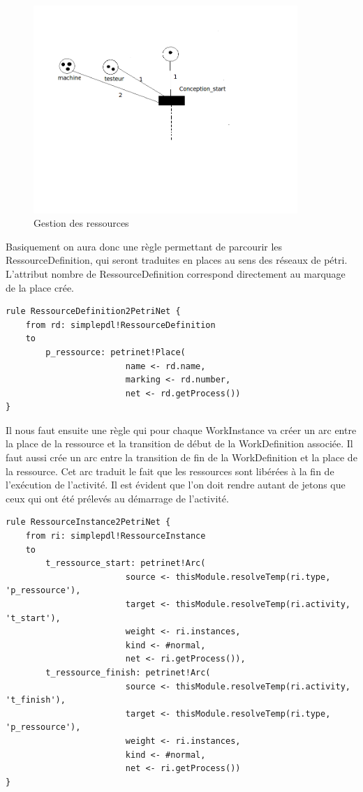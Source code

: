 \documentclass{report}
\begin{document}
\begin{figure}[!h] 
\begin{center}
\includegraphics[width=10cm]{petri1.png}
\caption{Gestion des ressources} 
\label{img1} 
\end{center}
\end{figure} 

Basiquement on aura donc une règle permettant de parcourir les RessourceDefinition, qui seront traduites en places au sens des réseaux de pétri. L'attribut nombre de RessourceDefinition correspond directement au marquage de la place crée.

\begin{verbatim}
rule RessourceDefinition2PetriNet {
	from rd: simplepdl!RessourceDefinition
	to
		p_ressource: petrinet!Place(
						name <- rd.name,
						marking <- rd.number,
						net <- rd.getProcess())
}
\end{verbatim}

Il nous faut ensuite une règle qui pour chaque WorkInstance va créer un arc entre la place de la ressource et la transition de début de la WorkDefinition associée.
Il faut aussi crée un arc entre la transition de fin de la WorkDefinition et la place de la ressource. Cet arc traduit le fait que les ressources sont libérées à la fin de l'exécution de l'activité. Il est évident que l'on doit rendre autant de jetons que ceux qui ont été prélevés au démarrage de l'activité.

\begin{verbatim}
rule RessourceInstance2PetriNet {
	from ri: simplepdl!RessourceInstance
	to
		t_ressource_start: petrinet!Arc(
						source <- thisModule.resolveTemp(ri.type, 'p_ressource'),
						target <- thisModule.resolveTemp(ri.activity, 't_start'),
						weight <- ri.instances,
						kind <- #normal,
						net <- ri.getProcess()),
		t_ressource_finish: petrinet!Arc(
						source <- thisModule.resolveTemp(ri.activity, 't_finish'),
						target <- thisModule.resolveTemp(ri.type, 'p_ressource'),
						weight <- ri.instances,
						kind <- #normal,
						net <- ri.getProcess())
}
\end{verbatim}
\end{document}
